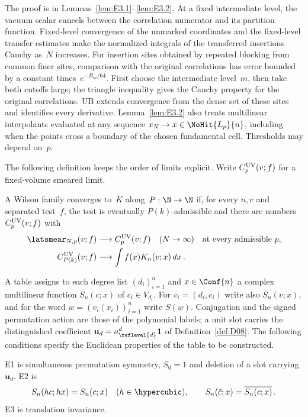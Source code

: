 The proof is in Lemmas~\ref{lem:E3.1}--\ref{lem:E3.2}. At a fixed intermediate level, the vacuum scalar cancels between the correlation numerator and its partition function. Fixed-level convergence of the unmarked coordinates and the fixed-level transfer estimates make the normalized integrals of the transferred insertions Cauchy as~$N$ increases. For insertion sites obtained by repeated blocking from common finer sites, comparison with the original correlations has error bounded by a constant times~$e^{-B_m/64}$. First choose the intermediate level~$m$, then take both cutoffs large; the triangle inequality gives the Cauchy property for the original correlations. UB extends convergence from the dense set of these sites and identifies every derivative. Lemma~\ref{lem:E3.2} also treats multilinear interpolants evaluated at any sequence $x_N\to x\in\NoHit{L_p}{n}$, including when the points cross a boundary of the chosen fundamental cell. Thresholds may depend on~$p$.

The following definition keeps the order of limits explicit. Write $C_p^{\rm UV}(v;f)$ for a fixed-volume smeared limit.
\begin{definition}\label{def:D09}
A Wilson family converges to~$K$ along~$P:\N\to\N$ if, for every $n,v$ and separated test~$f$, the test is eventually $P(k)$-admissible and there are numbers $C_p^{\rm UV}(v;f)$ with
\begin{align*}
\latsmear_{N,p}(v;f)&\longrightarrow C_p^{\rm UV}(v;f)\quad(N\to\infty)
&&\text{at every admissible }p,\\
C_{P(k)}^{\rm UV}(v;f)&\longrightarrow\int f(x)K_n(v;x)\,dx\,.
\end{align*}
\end{definition}

A table assigns to each degree list $(d_i)_{i=1}^n$ and $x\in\Conf{n}$ a complex multilinear function $S_n(c;x)$ of $c_i\in V_{d_i}$. For $v_i=(d_i,c_i)$ write also $S_n(v;x)$, and for the word $w=(v_i(x_i))_{i=1}^n$ write $S(w)$. Conjugation and the signed permutation action are those of the polynomial labels; a unit slot carries the distinguished coefficient $\mathbf u_d=a_{\reflevel{d}}^d\mathbf1$ of Definition~\ref{def:D08}. The following conditions specify the Euclidean properties of the table to be constructed.
\begin{definition}\label{def:E1-E3}
E1 is simultaneous permutation symmetry, $S_0=1$ and deletion of a slot carrying~$\mathbf u_d$. E2 is
\begin{equation*}
S_n(hc;hx)=S_n(c;x)\quad(h\in\hypercubic),\qquad
S_n(\bar c;x)=\overline{S_n(c;x)}\,.
\end{equation*}
E3 is translation invariance.
\end{definition}

